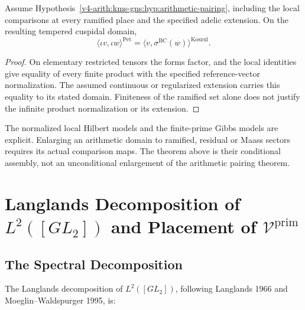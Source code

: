 \begin{theorem}
\label{v4-arith:kms-gns:thm:ramified-cuspidal-tempered-extension}
Assume Hypothesis~\ref{v4-arith:kms-gns:hyp:arithmetic-pairing},
including the local comparisons at every ramified place and the
specified adelic extension. On the resulting tempered cuspidal
domain,
\begin{equation}
\label{v4-arith:kms-gns:eq:ramified-cuspidal-match}
 \langle\iota v,\iota w\rangle^{\mathrm{Pet}}
 =\langle v,\sigma^{\mathrm{BC}}(w)\rangle^{\mathrm{Koszul}}.
\end{equation}
\end{theorem}
\begin{proof}
On elementary restricted tensors the forms factor, and the local
identities give equality of every finite product with the specified
reference-vector normalization. The assumed continuous or
regularized extension carries this equality to its stated domain.
Finiteness of the ramified set alone does not justify the infinite
product normalization or its extension.
\end{proof}

\begin{remark}
\label{v4-arith:kms-gns:rem:w3-tightening}
The normalized local Hilbert models and the finite-prime Gibbs
models are explicit. Enlarging an arithmetic domain to ramified,
residual or Maass sectors requires its actual comparison maps.
The theorem above is their conditional assembly, not an
unconditional enlargement of the arithmetic pairing theorem.
\end{remark}

\section{Langlands Decomposition of \(L^{2}([GL_{2}])\) and Placement of \(\mathcal{V}^{\mathrm{prim}}\)}
\label{v4-arith:kms-gns:cycle3}

\subsection{The Spectral Decomposition}
\label{v4-arith:kms-gns:cycle3:spectral}

The Langlands decomposition of \(L^{2}([GL_{2}])\), following
Langlands 1966 and Moeglin--Waldspurger 1995, is:

